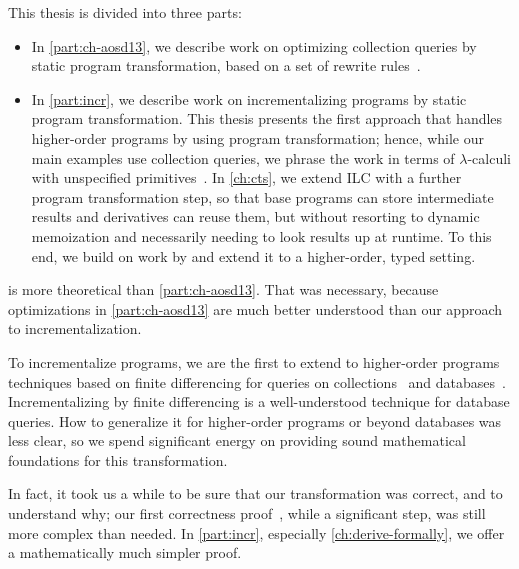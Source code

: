 This thesis is divided into three parts:
\begin{itemize}
\item In \cref{part:ch-aosd13}, we describe work on optimizing collection
  queries by static program transformation, based on a set of rewrite rules~\citep{GiarrussoAOSD13}.
\item In \cref{part:incr}, we describe work on incrementalizing programs
  by static program transformation. This thesis presents the first approach that
  handles higher-order programs by using program transformation; hence, while
  our main examples use collection queries, we phrase the work in terms of
  $\lambda$-calculi with unspecified primitives~\citep*{CaiEtAl2014ILC}.
  In \cref{ch:cts}, we extend ILC with a further program transformation
  step, so that base programs can store intermediate results and derivatives can
  reuse them, but without resorting to dynamic memoization and necessarily
  needing to look results up at runtime. To this end, we build on work by
\citet{Liu00} and extend it to a higher-order, typed setting.
\end{itemize}

 is more theoretical than
\cref{part:ch-aosd13}. That was necessary, because optimizations in
\cref{part:ch-aosd13} are much better understood than our approach to
incrementalization.

To incrementalize programs, we are the first to extend to higher-order programs
techniques based on finite differencing for queries on
collections~\citep{Paige82FDC} and
databases~\citep{Blakeley:1986:EUM,Gupta99MMV}.
Incrementalizing by finite differencing is a well-understood technique for
database queries. How to generalize it for higher-order programs or beyond
databases was less clear, so we spend significant energy on providing sound
mathematical foundations for this transformation.

In fact, it took us a while to be sure that our transformation was correct, and
to understand why; our first correctness proof~\citep*{CaiEtAl2014ILC}, while a
significant step, was still more complex than needed. In \cref{part:incr},
especially \cref{ch:derive-formally}, we offer a mathematically much simpler
proof.


